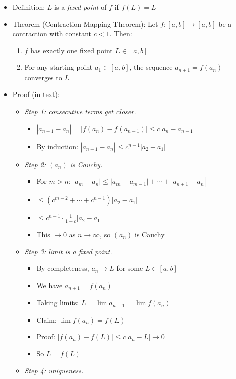 \documentclass[
  10pt,
  letterpaper,
]{scrbook}
\providecommand{\tightlist}{%
  \setlength{\itemsep}{0pt}\setlength{\parskip}{0pt}}
\begin{document}
\begin{itemize}
\tightlist
\item
  Definition: \(L\) is a \emph{fixed point} of \(f\) if \(f(L) = L\)
\item
  Theorem (Contraction Mapping Theorem): Let \(f: [a,b] \to [a,b]\) be a
  contraction with constant \(c < 1\). Then:

  \begin{enumerate}
  \def\labelenumi{\arabic{enumi}.}
  \tightlist
  \item
    \(f\) has exactly one fixed point \(L \in [a, b]\)
  \item
    For any starting point \(a_1 \in [a, b]\), the sequence
    \(a_{n+1} = f(a_n)\) converges to \(L\)
  \end{enumerate}
\item
  Proof (in text):

  \begin{itemize}
  \tightlist
  \item
    \emph{Step 1: consecutive terms get closer.}

    \begin{itemize}
    \tightlist
    \item
      \(|a_{n+1} - a_n| = |f(a_n) - f(a_{n-1})| \leq c|a_n - a_{n-1}|\)
    \item
      By induction: \(|a_{n+1} - a_n| \leq c^{n-1}|a_2 - a_1|\)
    \end{itemize}
  \item
    \emph{Step 2: \((a_n)\) is Cauchy.}

    \begin{itemize}
    \tightlist
    \item
      For \(m > n\):
      \(|a_m - a_n| \leq |a_m - a_{m-1}| + \cdots + |a_{n+1} - a_n|\)
    \item
      \(\leq (c^{m-2} + \cdots + c^{n-1})|a_2 - a_1|\)
    \item
      \(\leq c^{n-1} \cdot \frac{1}{1-c} |a_2 - a_1|\)
    \item
      This \(\to 0\) as \(n \to \infty\), so \((a_n)\) is Cauchy
    \end{itemize}
  \item
    \emph{Step 3: limit is a fixed point.}

    \begin{itemize}
    \tightlist
    \item
      By completeness, \(a_n \to L\) for some \(L \in [a, b]\)
    \item
      We have \(a_{n+1} = f(a_n)\)
    \item
      Taking limits: \(L = \lim a_{n+1} = \lim f(a_n)\)
    \item
      Claim: \(\lim f(a_n) = f(L)\)
    \item
      Proof: \(|f(a_n) - f(L)| \leq c|a_n - L| \to 0\)
    \item
      So \(L = f(L)\)
    \end{itemize}
  \item
    \emph{Step 4: uniqueness.}


\end{itemize}
\end{itemize}
\end{document}
